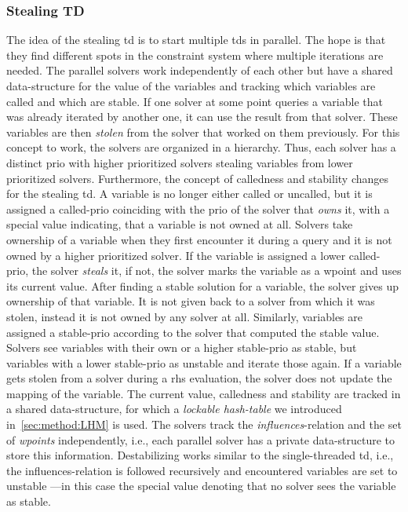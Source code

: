     \subsubsection{Stealing TD}
    \label{sec:method:td_parallel:stealing}
    The idea of the stealing \ac{td} is to start multiple \acp{td} in parallel. The hope is that they find different spots in the constraint system where multiple iterations are needed. The parallel solvers work independently of each other but have a shared data-structure for the value of the variables and tracking which variables are called and which are stable. If one solver at some point queries a variable that was already iterated by another one, it can use the result from that solver. These variables are then \textit{stolen} from the solver that worked on them previously.
    For this concept to work, the solvers are organized in a hierarchy. Thus, each solver has a distinct \ac{prio} with higher prioritized solvers stealing variables from lower prioritized solvers. Furthermore, the concept of calledness and stability changes for the stealing \ac{td}. A variable is no longer either called or uncalled, but it is assigned a called-\ac{prio} coinciding with the \ac{prio} of the solver that \textit{owns} it, with a special value indicating, that a variable is not owned at all. Solvers take ownership of a variable when they first encounter it during a query and it is not owned by a higher prioritized solver. If the variable is assigned a lower called-\ac{prio}, the solver \textit{steals} it, if not, the solver marks the variable as a wpoint and uses its current value.
    After finding a stable solution for a variable, the solver gives up ownership of that variable. It is not given back to a solver from which it was stolen, instead it is not owned by any solver at all. Similarly, variables are assigned a stable-\ac{prio} according to the solver that computed the stable value. Solvers see variables with their own or a higher stable-\ac{prio} as stable, but variables with a lower stable-\ac{prio} as unstable and iterate those again. If a variable gets stolen from a solver during a \ac{rhs} evaluation, the solver does not update the mapping of the variable.
    The current value, calledness and stability are tracked in a shared data-structure, for which a \textit{lockable hash-table} we introduced in~\autoref{sec:method:LHM} is used. The solvers track the \textit{influences}-relation and the set of \textit{wpoints} independently, i.e., each parallel solver has a private data-structure to store this information. Destabilizing works similar to the single-threaded \ac{td}, i.e., the influences-relation is followed recursively and encountered variables are set to unstable ---in this case the special value denoting that no solver sees the variable as stable.

